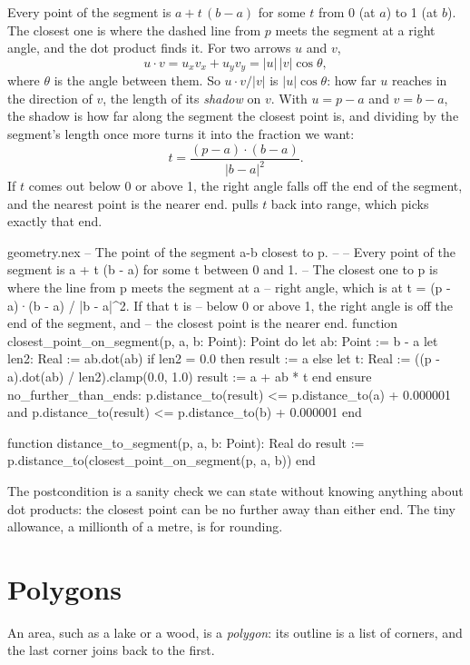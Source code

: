 Every point of the segment is $a + t\,(b - a)$ for some $t$ from 0 (at $a$)
to 1 (at $b$). The closest one is where the dashed line from $p$ meets the
segment at a right angle, and the dot product finds it. For two arrows
$u$ and $v$,
\[
  u \cdot v = u_x v_x + u_y v_y = |u|\,|v|\cos\theta,
\]
where $\theta$ is the angle between them. So $u \cdot v / |v|$ is
$|u|\cos\theta$: how far $u$ reaches in the direction of $v$, the length of
its \emph{shadow} on $v$. With $u = p - a$ and $v = b - a$, the shadow is
how far along the segment the closest point is, and dividing by the
segment's length once more turns it into the fraction we want:
\[
  t = \frac{(p - a) \cdot (b - a)}{|b - a|^2}.
\]
If $t$ comes out below 0 or above 1, the right angle falls off the end of
the segment, and the nearest point is the nearer end. 
pulls $t$ back into range, which picks exactly that end.

\begin{append}{geometry.nex}
-- The point of the segment a-b closest to p.
--
-- Every point of the segment is a + t (b - a) for some t between 0 and 1.
-- The closest one to p is where the line from p meets the segment at a
-- right angle, which is at t = (p - a)·(b - a) / |b - a|^2. If that t is
-- below 0 or above 1, the right angle is off the end of the segment, and
-- the closest point is the nearer end.
function closest_point_on_segment(p, a, b: Point): Point do
  let ab: Point := b - a
  let len2: Real := ab.dot(ab)
  if len2 = 0.0 then
    result := a
  else
    let t: Real := ((p - a).dot(ab) / len2).clamp(0.0, 1.0)
    result := a + ab * t
  end
ensure
  no_further_than_ends: p.distance_to(result) <= p.distance_to(a) + 0.000001
    and p.distance_to(result) <= p.distance_to(b) + 0.000001
end

function distance_to_segment(p, a, b: Point): Real do
  result := p.distance_to(closest_point_on_segment(p, a, b))
end
\end{append}

The postcondition is a sanity check we can state without knowing anything
about dot products: the closest point can be no further away than either
end. The tiny allowance, a millionth of a metre, is for rounding.

\section{Polygons}

An area, such as a lake or a wood, is a \emph{polygon}: its outline is a
list of corners, and the last corner joins back to the first.


